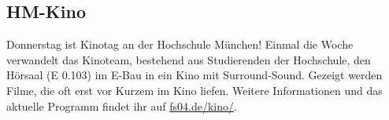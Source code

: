 \subsection{HM-Kino}
Donnerstag ist Kinotag an der Hochschule München! \doublebreak
Einmal die Woche verwandelt das Kinoteam, bestehend aus Studierenden der Hochschule, den Hörsaal (E 0.103) 
im E-Bau in ein Kino mit Surround-Sound. Gezeigt werden Filme, die oft 
erst vor Kurzem im Kino liefen. \doublebreak
Weitere Informationen und das aktuelle Programm findet ihr auf 
\url{fs04.de/kino/}.